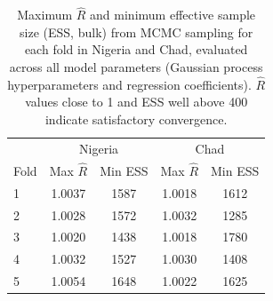 \begin{table}[t!]
    \centering
\caption{Maximum $\hat{R}$ and minimum effective sample size (ESS, bulk) from MCMC sampling for each fold in Nigeria and Chad, evaluated across all model parameters (Gaussian process hyperparameters and regression coefficients). $\hat{R}$ values close to 1 and ESS well above 400 indicate satisfactory convergence.}
    \label{tab:res_cv}
    \begin{tabular}{lcccc}
    \toprule
    & \multicolumn{2}{c}{Nigeria} & \multicolumn{2}{c}{Chad} \\
    Fold & Max $\hat{R}$ & Min ESS & Max $\hat{R}$ & Min ESS \\
    \midrule
    1 & 1.0037 & 1587 & 1.0018 & 1612 \\
    2 & 1.0028 & 1572 & 1.0032 & 1285 \\
    3 & 1.0020 & 1438 & 1.0018 & 1780 \\
    4 & 1.0032 & 1527 & 1.0030 & 1408 \\
    5 & 1.0054 & 1648 & 1.0022 & 1625 \\
    \bottomrule
    \end{tabular}
\end{table}

